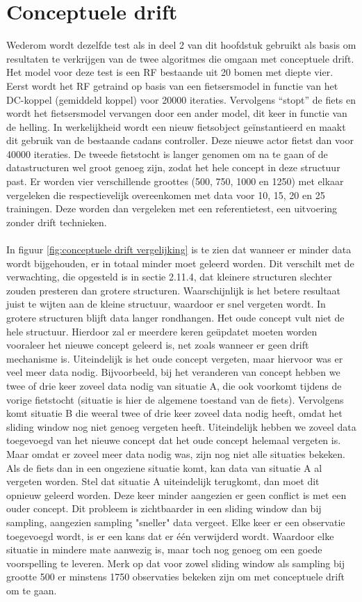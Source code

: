 \section{Conceptuele drift}
Wederom wordt dezelfde test als in deel 2 van dit hoofdstuk gebruikt als basis om resultaten te verkrijgen van de twee algoritmes die omgaan met conceptuele drift. Het model voor deze test is een RF bestaande uit 20 bomen met diepte vier. Eerst wordt het RF getraind op basis van een fietsersmodel in functie van het DC-koppel (gemiddeld koppel) voor 20000 iteraties. Vervolgens “stopt” de fiets en wordt het fietsersmodel vervangen door een ander model, dit keer in functie van de helling. In werkelijkheid wordt een nieuw fietsobject geïnstantieerd en maakt dit gebruik van de bestaande cadans controller. Deze nieuwe actor fietst dan voor 40000 iteraties. De tweede fietstocht is langer genomen om na te gaan of de datastructuren wel groot genoeg zijn, zodat het hele concept in deze structuur past. Er worden vier verschillende groottes (500, 750, 1000 en 1250) met elkaar vergeleken die respectievelijk overeenkomen met data voor 10, 15, 20 en 25 trainingen. Deze worden dan vergeleken met een referentietest, een uitvoering zonder drift technieken. 
\\\\
In figuur \ref{fig:conceptuele drift vergelijking} is te zien dat wanneer er minder data wordt bijgehouden, er in totaal minder moet geleerd worden. Dit verschilt met de verwachting, die opgesteld is in sectie 2.11.4, dat kleinere structuren slechter zouden presteren dan grotere structuren. Waarschijnlijk is het betere resultaat juist te wijten aan de kleine structuur, waardoor er snel vergeten wordt. In grotere structuren blijft data langer rondhangen. Het oude concept vult niet de hele structuur. Hierdoor zal er meerdere keren geüpdatet moeten worden vooraleer het nieuwe concept geleerd is, net zoals wanneer er geen drift mechanisme is. Uiteindelijk is het oude concept vergeten, maar hiervoor was er veel meer data nodig. Bijvoorbeeld, bij het veranderen van concept hebben we twee of drie keer zoveel data nodig van situatie A, die ook voorkomt tijdens de vorige fietstocht (situatie is hier de algemene toestand van de fiets). Vervolgens komt situatie B die weeral twee of drie keer zoveel data nodig heeft, omdat het sliding window nog niet genoeg vergeten heeft. Uiteindelijk hebben we zoveel data toegevoegd van het nieuwe concept dat het oude concept helemaal vergeten is. Maar omdat er zoveel meer data nodig was, zijn nog niet alle situaties bekeken. Als de fiets dan in een ongeziene situatie komt, kan data van situatie A al vergeten worden. Stel dat situatie A uiteindelijk terugkomt, dan moet dit opnieuw geleerd worden. Deze keer minder aangezien er geen conflict is met een ouder concept. Dit probleem is zichtbaarder in een sliding window dan bij sampling, aangezien sampling "sneller" data vergeet. Elke keer er een observatie toegevoegd wordt, is er een kans dat er één verwijderd wordt. Waardoor elke situatie in mindere mate aanwezig is, maar toch nog genoeg om een goede voorspelling te leveren. Merk op dat voor zowel sliding window als sampling bij grootte 500 er minstens 1750 observaties bekeken zijn om met conceptuele drift om te gaan.

